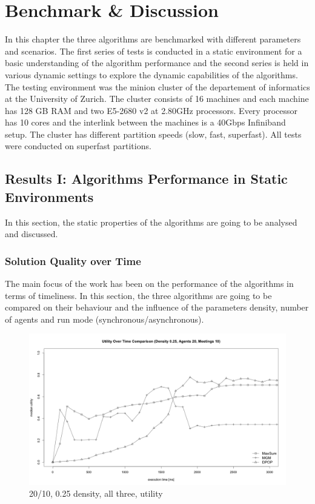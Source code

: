 \chapter{Benchmark \& Discussion}

In this chapter the three algorithms are benchmarked with different parameters and scenarios. The first series of tests is conducted in a static environment for a basic understanding of the algorithm performance and the second series is held in various dynamic settings to explore the dynamic capabilities of the algorithms. The testing environment was the minion cluster of the departement of informatics at the University of Zurich. The cluster consists of 16 machines and each machine has 128 GB RAM and two E5-2680 v2 at 2.80GHz processors. Every processor has 10 cores and the interlink between the machines is a 40Gbps Infiniband setup. The cluster has different partition speeds (slow, fast, superfast). All tests were conducted on superfast partitions.

\section{Results I: Algorithms Performance in Static Environments}

In this section, the static properties of the algorithms are going to be analysed and discussed.

\subsection{Solution Quality over Time}

The main focus of the work has been on the performance of the algorithms in terms of timeliness.  In this section, the three algorithms are going to be compared on their behaviour and the influence of the parameters density, number of agents and run mode (synchronous/asynchronous).

\begin{figure}[H]
\centering
\includegraphics[width=430px]{graphics/experiments/static/quality/sq_1}
\caption{20/10, 0.25 density, all three, utility}
\label{fig:mgm_graph}
\end{figure}

